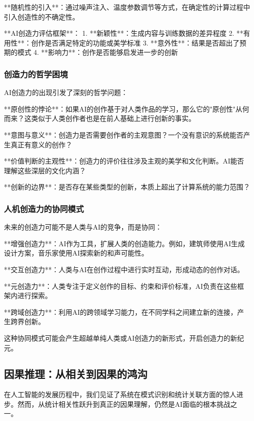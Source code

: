 **随机性的引入**：通过噪声注入、温度参数调节等方式，在确定性的计算过程中引入创造性的不确定性。

\begin{center}
**AI创造力评估框架**：
1. **新颖性**：生成内容与训练数据的差异程度
2. **有用性**：创作是否满足特定的功能或美学标准
3. **意外性**：结果是否超出了预期的模式
4. **影响力**：创作是否能够启发进一步的创新
\end{center}

\subsubsection{创造力的哲学困境}

AI创造力的出现引发了深刻的哲学问题：

**原创性的悖论**：如果AI的创作基于对人类作品的学习，那么它的"原创性"从何而来？这类似于人类创作者也是在前人基础上进行创新的事实。

**意图与意义**：创造力是否需要创作者的主观意图？一个没有意识的系统能否产生真正有意义的创作？

**价值判断的主观性**：创造力的评价往往涉及主观的美学和文化判断。AI能否理解这些深层的文化内涵？

**创新的边界**：是否存在某些类型的创新，本质上超出了计算系统的能力范围？

\subsubsection{人机创造力的协同模式}

未来的创造力可能不是人类与AI的竞争，而是协同：

**增强创造力**：AI作为工具，扩展人类的创造能力。例如，建筑师使用AI生成设计方案，音乐家使用AI探索新的和声可能性。

**交互创造力**：人类与AI在创作过程中进行实时互动，形成动态的创作对话。

**元创造力**：人类专注于定义创作的目标、约束和评价标准，AI负责在这些框架内进行探索。

**跨域创造力**：利用AI的跨领域学习能力，在不同学科之间建立新的连接，产生跨界创新。

这种协同模式可能会产生超越单纯人类或AI创造力的新形式，开启创造力的新纪元。

\subsection{因果推理：从相关到因果的鸿沟}

在人工智能的发展历程中，我们见证了系统在模式识别和统计关联方面的惊人进步。然而，从统计相关性跃升到真正的因果理解，仍然是AI面临的根本挑战之一。

